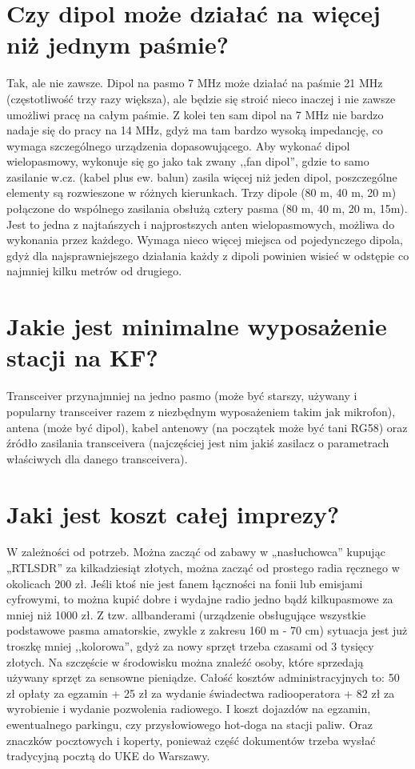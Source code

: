 \documentclass[a4paper,12pt]{article}
\begin{document}
\section{Czy dipol może działać na więcej niż jednym paśmie?}
Tak, ale nie zawsze. Dipol na pasmo 7 MHz może działać na paśmie 21 MHz (częstotliwość trzy razy większa), ale będzie się stroić nieco inaczej i nie zawsze umożliwi pracę na całym paśmie. Z kolei ten sam dipol na 7 MHz nie bardzo nadaje się do pracy na 14 MHz, gdyż ma tam bardzo wysoką impedancję, co wymaga szczególnego urządzenia dopasowującego. Aby wykonać dipol wielopasmowy, wykonuje się go jako tak zwany ,,fan dipol'', gdzie to samo zasilanie w.cz. (kabel plus ew. balun) zasila więcej niż jeden dipol, poszczególne elementy są rozwieszone w różnych kierunkach. Trzy dipole (80 m, 40 m, 20 m) połączone do wspólnego zasilania obsłużą cztery pasma (80 m, 40 m, 20 m, 15m). Jest to jedna z najtańszych i najprostszych anten wielopasmowych, możliwa do wykonania przez każdego. Wymaga nieco więcej miejsca od pojedynczego dipola, gdyż dla najsprawniejszego działania każdy z dipoli powinien wisieć w odstępie co najmniej kilku metrów od drugiego.

\section{Jakie jest minimalne wyposażenie stacji na KF?}
Transceiver przynajmniej na jedno pasmo (może być starszy, używany i popularny transceiver razem z niezbędnym wyposażeniem takim jak mikrofon), antena (może być dipol), kabel antenowy (na początek może być tani RG58) oraz źródło zasilania transceivera (najczęściej jest nim jakiś zasilacz o parametrach właściwych dla danego transceivera).

\section{Jaki jest koszt całej imprezy?}
W zależności od potrzeb. Można zacząć od zabawy w „nasłuchowca” kupując „RTLSDR” za kilkadziesiąt złotych, można zacząć od prostego radia ręcznego w okolicach 200 zł. Jeśli ktoś nie jest fanem łączności na fonii lub emisjami cyfrowymi, to można kupić dobre i wydajne radio jedno bądź kilkupasmowe za mniej niż 1000 zł. Z tzw. allbanderami (urządzenie obsługujące wszystkie podstawowe pasma amatorskie, zwykle z zakresu 160 m - 70 cm) sytuacja jest już troszkę mniej ,,kolorowa'', gdyż za nowy sprzęt trzeba czasami od 3 tysięcy złotych. Na szczęście w środowisku można znaleźć osoby, które sprzedają używany sprzęt za sensowne pieniądze.
Całość kosztów administracyjnych to: 50 zł opłaty za egzamin + 25 zł za wydanie świadectwa radiooperatora + 82 zł za wyrobienie i wydanie pozwolenia radiowego. I koszt dojazdów na egzamin, ewentualnego parkingu, czy przysłowiowego hot-doga na stacji paliw. Oraz znaczków pocztowych i koperty, ponieważ część dokumentów trzeba wysłać tradycyjną pocztą do UKE do Warszawy.
\end{document}
